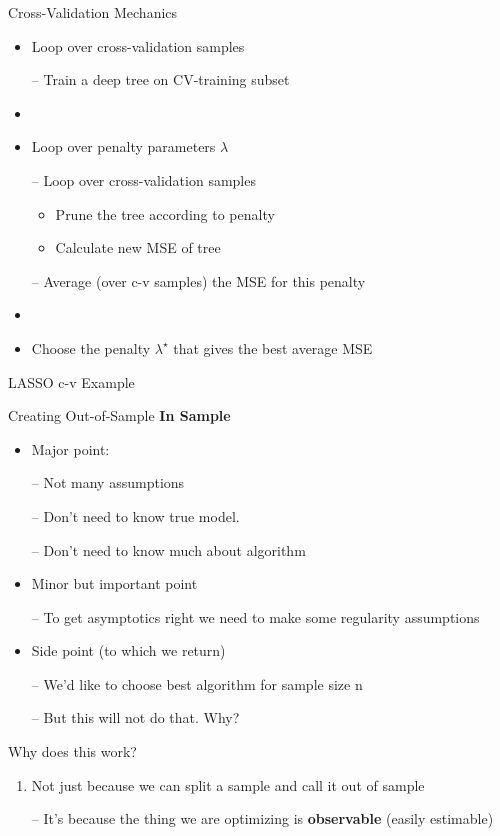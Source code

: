 \documentclass{beamer}
\begin{document}
\begin{frame}{Cross-Validation Mechanics}
	\begin{itemize}
		\item Loop over cross-validation samples
		
		– Train a deep tree on CV-training subset
		\item[]
		\item Loop over penalty parameters $\lambda$
		
		– Loop over cross-validation samples 
		\begin{itemize}
			\item Prune the tree according to penalty
			\item Calculate new MSE of tree
		\end{itemize}
		
		– Average (over c-v samples) the MSE for this penalty
		\item[]
		\item Choose the penalty $\lambda^\star$ that gives the best average MSE
	\end{itemize}
\end{frame}

\begin{frame}{LASSO c-v Example}
	
\end{frame}

\begin{frame}{Creating Out-of-Sample \textbf{In Sample}}
	\begin{itemize}
		\item Major point:
		
		– Not many assumptions
		
		– Don’t need to know true model.
		
		– Don’t need to know much about algorithm
		\item Minor but important point
		
		– To get asymptotics right we need to make some regularity assumptions
		\item Side point (to which we return)
		
		– We’d like to choose best algorithm for sample size n 
		
		– But this will not do that. Why?
	\end{itemize}
\end{frame}

\begin{frame}{Why does this work?}	
	\begin{enumerate}
		\item Not just because we can split a sample and call it out of sample
		
			– It’s because the thing we are optimizing is \textbf{observable} (easily estimable)
	\end{enumerate}
\end{frame}
\end{document}
